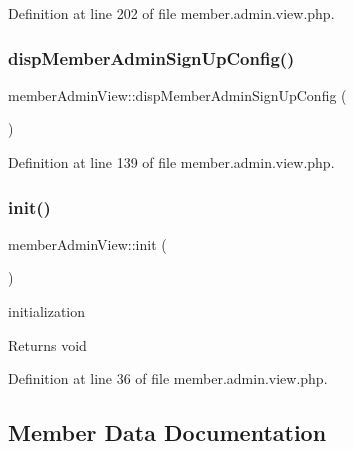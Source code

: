 Definition at line 202 of file member.\+admin.\+view.\+php.

\hypertarget{classmemberAdminView_af3ab8ea3d555e7e685c6c4706e3ea545}{}\label{classmemberAdminView_af3ab8ea3d555e7e685c6c4706e3ea545} 
\subsubsection{\texorpdfstring{disp\+Member\+Admin\+Sign\+Up\+Config()}{dispMemberAdminSignUpConfig()}}
{\footnotesize\ttfamily member\+Admin\+View\+::disp\+Member\+Admin\+Sign\+Up\+Config (\begin{DoxyParamCaption}{ }\end{DoxyParamCaption})}



Definition at line 139 of file member.\+admin.\+view.\+php.

\hypertarget{classmemberAdminView_abfcff5343cc06cfa70fa1994b8a77d05}{}\label{classmemberAdminView_abfcff5343cc06cfa70fa1994b8a77d05} 
\subsubsection{\texorpdfstring{init()}{init()}}
{\footnotesize\ttfamily member\+Admin\+View\+::init (\begin{DoxyParamCaption}{ }\end{DoxyParamCaption})}

initialization

\begin{DoxyReturn}{Returns}
void 
\end{DoxyReturn}


Definition at line 36 of file member.\+admin.\+view.\+php.



\subsection{Member Data Documentation}
\hypertarget{classmemberAdminView_a900a93ad7807c2f056b5055cf33f6be6}{}\label{classmemberAdminView_a900a93ad7807c2f056b5055cf33f6be6} 
